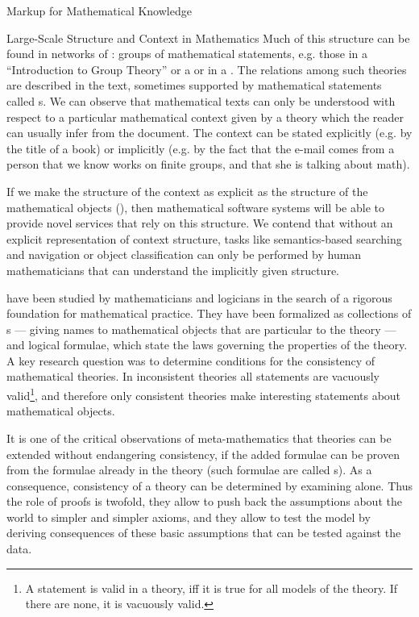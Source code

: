 \begin{omgroup}[id=math-markup]{Markup for Mathematical Knowledge}
\begin{module}[id=math-context]
\begin{omgroup}[id=meta-theories]{Large-Scale Structure and Context in Mathematics}
  Much of this structure can be found in networks of {\emph{}}: groups of mathematical statements, e.g. those
  in a  ``Introduction to Group Theory'' or a {} or
  {} in a {}. The relations among such theories are
  described in the text, sometimes supported by mathematical statements called
  {s}. We can observe that mathematical texts can only be
  understood with respect to a particular mathematical context given by a theory which the
  reader can usually infer from the document. The context can be stated explicitly
  (e.g. by the title of a book) or implicitly (e.g. by the fact that the e-mail comes from
  a person that we know works on finite groups, and that she is talking about math).

  If we make the structure of the context as explicit as the structure of the mathematical
  objects (), then mathematical software
  systems will be able to provide novel services that rely on this structure. We contend
  that without an explicit representation of context structure, tasks like semantics-based
  searching and navigation or object classification can only be performed by human
  mathematicians that can understand the implicitly given structure.

  {} have been studied by mathematicians
  and logicians in the search of a rigorous foundation for mathematical practice. They
  have been formalized as collections of {s} --- giving names
  to mathematical objects that are particular to the theory --- and logical formulae,
  which state the laws governing the properties of the theory. A key research question was
  to determine conditions for the consistency of mathematical theories. In inconsistent
  theories all statements are vacuously valid\footnote{A statement is valid in a theory,
    iff it is true for all models of the theory. If there are none, it is vacuously
    valid.}, and therefore only consistent theories make interesting statements about
  mathematical objects.

It is one of the critical observations of meta-mathematics that theories can be extended
without endangering consistency, if the added formulae can be proven from the formulae
already in the theory (such formulae are called {s}). As a consequence,
consistency of a theory can be determined by examining  alone. Thus the role of proofs is twofold, they allow to
push back the assumptions about the world to simpler and simpler axioms, and they allow to
test the model by deriving consequences of these basic assumptions that can be tested
against the data.
  

\end{omgroup}
\end{module}
\end{omgroup}
